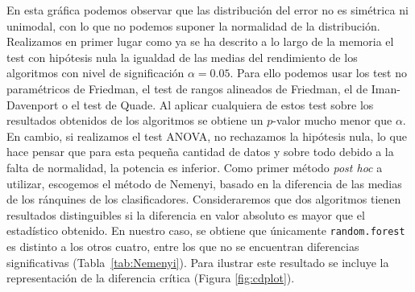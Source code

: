 	En esta gráfica podemos observar que las distribución del
error no es simétrica ni unimodal, con lo que no podemos
suponer la normalidad de la distribución. Realizamos en 
primer lugar como ya se ha descrito a lo largo de la memoria
el test con hipótesis nula la igualdad de las medias del
rendimiento de los algoritmos con nivel de significación
$\alpha = 0.05$. Para ello podemos usar
los test no paramétricos de Friedman, el test de
rangos alineados de Friedman, el de Iman-Davenport o el
test de Quade. Al aplicar cualquiera de estos test sobre
los resultados obtenidos de los algoritmos se obtiene
un $p$-valor mucho menor que $\alpha$. En cambio, 
si realizamos el test ANOVA, no rechazamos la hipótesis
nula, lo que hace pensar que para esta pequeña cantidad de
datos y sobre todo debido a la falta de normalidad, la
potencia es inferior. Como primer método \textit{post hoc}
a utilizar, escogemos el método de Nemenyi, basado en la
diferencia de las medias de los ránquines de los 
clasificadores. Consideraremos que dos algoritmos tienen
resultados distinguibles si la diferencia en valor absoluto
es mayor que el estadístico obtenido. En nuestro caso, 
se obtiene que únicamente \texttt{random.forest} es distinto
a los otros cuatro, entre los que no se encuentran 
diferencias significativas (Tabla~\ref{tab:Nemenyi}). Para ilustrar este resultado
se incluye la representación de la diferencia crítica (Figura \ref{fig:cdplot}).

\begin{table}[]
\centering
\caption{Test de Nemenyi}
\label{tab:Nemenyi}
\end{table}


